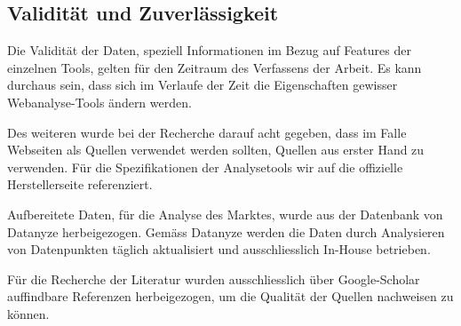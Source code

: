 \subsection{Validität und Zuverlässigkeit}
Die Validität der Daten, speziell Informationen im Bezug auf Features der einzelnen Tools, gelten für den Zeitraum des Verfassens der Arbeit. Es kann durchaus sein, dass sich im Verlaufe der Zeit die Eigenschaften gewisser Webanalyse-Tools ändern werden. 

Des weiteren wurde bei der Recherche darauf acht gegeben, dass im Falle Webseiten als Quellen verwendet werden sollten, Quellen aus erster Hand zu verwenden. Für die Spezifikationen der Analysetools wir auf die offizielle Herstellerseite referenziert.

Aufbereitete Daten, für die Analyse des Marktes, wurde aus der Datenbank von Datanyze \parencite{datanyzeSwitzerlandWebanalytics} herbeigezogen. Gemäss Datanyze \parencite{datanyzeFAQ} werden die Daten durch Analysieren von Datenpunkten täglich aktualisiert und ausschliesslich In-House betrieben.

Für die Recherche der Literatur wurden ausschliesslich über Google-Scholar auffindbare Referenzen herbeigezogen, um die Qualität der Quellen nachweisen zu können.

